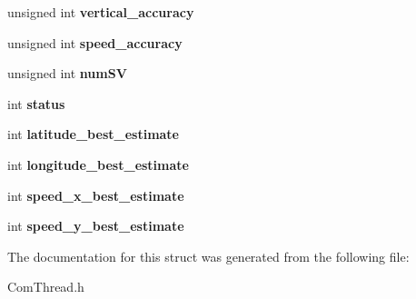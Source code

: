 \begin{DoxyCompactItemize}
\item 
\hypertarget{struct_g_p_s___d_a_t_a___a_d_v_a_n_c_e_d_a25791456e64fe8e94fb4a9cace8006b9}{unsigned int {\bfseries vertical\-\_\-accuracy}}\label{struct_g_p_s___d_a_t_a___a_d_v_a_n_c_e_d_a25791456e64fe8e94fb4a9cace8006b9}

\item 
\hypertarget{struct_g_p_s___d_a_t_a___a_d_v_a_n_c_e_d_a1c677bf95c33f0c4afde61a9a0e76400}{unsigned int {\bfseries speed\-\_\-accuracy}}\label{struct_g_p_s___d_a_t_a___a_d_v_a_n_c_e_d_a1c677bf95c33f0c4afde61a9a0e76400}

\item 
\hypertarget{struct_g_p_s___d_a_t_a___a_d_v_a_n_c_e_d_abcff2206122e92e8c6fac01e45708a1a}{unsigned int {\bfseries num\-S\-V}}\label{struct_g_p_s___d_a_t_a___a_d_v_a_n_c_e_d_abcff2206122e92e8c6fac01e45708a1a}

\item 
\hypertarget{struct_g_p_s___d_a_t_a___a_d_v_a_n_c_e_d_a3046f9c7a01a66ae86a4baae3750a39c}{int {\bfseries status}}\label{struct_g_p_s___d_a_t_a___a_d_v_a_n_c_e_d_a3046f9c7a01a66ae86a4baae3750a39c}

\item 
\hypertarget{struct_g_p_s___d_a_t_a___a_d_v_a_n_c_e_d_a9d2b2d40144bd8b6e12729f35bbf3302}{int {\bfseries latitude\-\_\-best\-\_\-estimate}}\label{struct_g_p_s___d_a_t_a___a_d_v_a_n_c_e_d_a9d2b2d40144bd8b6e12729f35bbf3302}

\item 
\hypertarget{struct_g_p_s___d_a_t_a___a_d_v_a_n_c_e_d_aec26b9de17d42b5a87bd1c9cdf1346d1}{int {\bfseries longitude\-\_\-best\-\_\-estimate}}\label{struct_g_p_s___d_a_t_a___a_d_v_a_n_c_e_d_aec26b9de17d42b5a87bd1c9cdf1346d1}

\item 
\hypertarget{struct_g_p_s___d_a_t_a___a_d_v_a_n_c_e_d_a3d3186d222a1d71b6f862f75e1958f4e}{int {\bfseries speed\-\_\-x\-\_\-best\-\_\-estimate}}\label{struct_g_p_s___d_a_t_a___a_d_v_a_n_c_e_d_a3d3186d222a1d71b6f862f75e1958f4e}

\item 
\hypertarget{struct_g_p_s___d_a_t_a___a_d_v_a_n_c_e_d_a98fd29fd2fe56f96bfe50f750474eda1}{int {\bfseries speed\-\_\-y\-\_\-best\-\_\-estimate}}\label{struct_g_p_s___d_a_t_a___a_d_v_a_n_c_e_d_a98fd29fd2fe56f96bfe50f750474eda1}

\end{DoxyCompactItemize}


The documentation for this struct was generated from the following file\-:\begin{DoxyCompactItemize}
\item 
Com\-Thread.\-h\end{DoxyCompactItemize}
